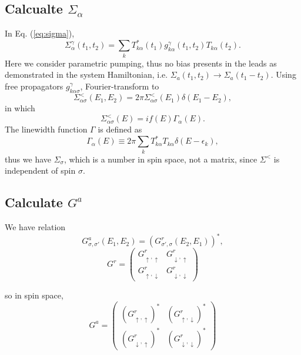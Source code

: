\documentclass[11pt,a4paper]{article}
\begin{document}
\subsection{Calcualte $\Sigma_{\alpha}$}
In Eq. (\ref{eq:sigma}), 
\begin{equation}
\Sigma_{\alpha}^{\gamma}\left(t_{1}, t_{2}\right)=\sum_{k} T_{k \alpha}^{*}\left(t_{1}\right) g_{k \alpha}^{\gamma}\left(t_{1}, t_{2}\right) T_{k \alpha}\left(t_{2}\right).
\end{equation}
Here we consider parametric pumping, thus no bias presents in the leads as demonstrated in the system Hamiltonian, i.e. $\Sigma_{a}(t_{1},t_{2}) \rightarrow \Sigma_{a} (t_{1}-t_{2})$. Using free propagators $g_{k\alpha\sigma}^{\gamma}$, Fourier-transform to
\begin{equation}
\Sigma_{\alpha\sigma}^{<}(E_{1},E_{2}) =2\pi \Sigma_{\alpha\sigma}^{<}(E_{1})\delta(E_{1}-E_{2}),
\end{equation}
in which
\begin{equation}
\Sigma_{\alpha\sigma}^{<}(E)=i  f(E) \Gamma_{\alpha}\left(E\right).
\end{equation}
The linewidth function $\Gamma$ is defined as
\begin{equation}
\Gamma_{\alpha}(E) \equiv 2 \pi \sum_{k} T_{k \alpha}^{*} T_{k \alpha} \delta\left(E-\epsilon_{k}\right),
\end{equation}
thus we have $\Sigma_{\sigma}$, which is a number in spin space, not a matrix, since $\Sigma^{<}$ is independent of spin $\sigma$.
\subsection{Calculate $G^{a}$}
We have relation
\begin{equation}
G_{\sigma,\sigma'}^{a}\left(E_{1}, E_{2}\right)=(G_{\sigma',\sigma}^{r}\left(E_{2}, E_{1}\right))^{*},
\end{equation}
\begin{equation}
G^{r}=\left(\begin{array}{cc}
G_{\uparrow,\uparrow}^{r} & G_{\downarrow,\uparrow}^{r} \\
G_{\uparrow,\downarrow}^{r} & G_{\downarrow,\downarrow}^{r}
\end{array}\right)
\end{equation}

so in spin space, 
\begin{equation}
G^{a}=\left(\begin{array}{cc}
(G_{\uparrow,\uparrow}^{r})^{*} & (G_{\uparrow,\downarrow}^{r})^{*} \\
(G_{\downarrow,\uparrow}^{r})^{*} & (G_{\downarrow,\downarrow}^{r})^{*}
\end{array}\right)
\end{equation}
\end{document}
